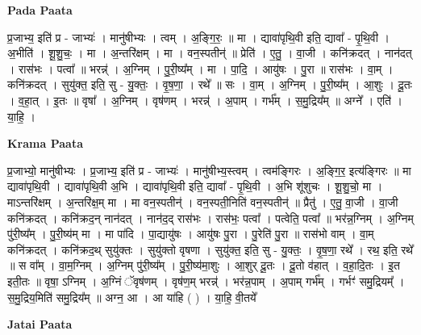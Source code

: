 \documentclass[17pt]{extarticle}
\begin{document}
\textbf{Pada Paata} \newline

प्र॒जाभ्य॒ इति॑ प्र - जाभ्यः॑ । मानु॑षीभ्यः । त्वम् । अ॒ङ्गि॒रः॒ ॥ मा । द्यावा॑पृथि॒वी इति॒ द्यावा᳚ - पृ॒थि॒वी । अ॒भीति॑ । शू॒शु॒चः॒ । मा । अ॒न्तरि॑क्षम् । मा । वन॒स्पतीन्॑ ॥ प्रेति॑ । ए॒तु॒ । वा॒जी । कनि॑क्रदत् । नान॑दत् । रास॑भः । पत्वा᳚ ॥ भरन्न्॑ । अ॒ग्निम् । पु॒री॒ष्य᳚म् । मा । पा॒दि॒ । आयु॑षः । पु॒रा ॥ रास॑भः । वा॒म् । कनि॑क्रदत् । सुयु॑क्त॒ इति॒ सु - यु॒क्तः॒ । वृ॒ष॒णा॒ । रथे᳚ ॥ सः । वा॒म् । अ॒ग्निम् । पु॒री॒ष्य᳚म् । आ॒शुः । दू॒तः । व॒हा॒त् । इ॒तः ॥ वृषा᳚ । अ॒ग्निम् । वृष॑णम् । भरन्न्॑ । अ॒पाम् । गर्भ᳚म् । स॒मु॒द्रिय᳚म् ॥ अग्ने᳚ । एति॑ । या॒हि॒ ।  \newline


\textbf{Krama Paata} \newline

प्र॒जाभ्यो॒ मानु॑षीभ्यः । प्र॒जाभ्य॒ इति॑ प्र - जाभ्यः॑ । मानु॑षीभ्य॒स्त्वम् । त्वम॑ङ्गिरः । अ॒ङ्गि॒र॒ इत्य॑ङ्गिरः ॥ मा द्यावा॑पृथि॒वी । द्यावा॑पृथि॒वी अ॒भि । द्यावा॑पृथि॒वी इति॒ द्यावा᳚ - पृ॒थि॒वी । अ॒भि शू॑शुचः । शू॒शु॒चो॒ मा । माऽन्तरि॑क्षम् । अ॒न्तरि॑क्ष॒म् मा । मा वन॒स्पतीन्॑ । वन॒स्पती॒निति॑ वन॒स्पतीन्॑ ॥ प्रैतु॑ । ए॒तु॒ वा॒जी । वा॒जी कनि॑क्रदत् । कनि॑क्रद॒न् नान॑दत् । नान॑द॒द् रास॑भः । रास॑भः॒ पत्वा᳚ । पत्वेति॒ पत्वा᳚ ॥ भर॑न्न॒ग्निम् । अ॒ग्निम् पु॑री॒ष्य᳚म् । पु॒री॒ष्य॑म् मा । मा पा॑दि । पा॒द्यायु॑षः । आयु॑षः पु॒रा । पु॒रेति॑ पु॒रा ॥ रास॑भो वाम् । वा॒म् कनि॑क्रदत् । कनि॑क्रद॒थ् सुयु॑क्तः । सुयु॑क्तो वृषणा । सुयु॑क्त॒ इति॒ सु - यु॒क्तः॒ । वृ॒ष॒णा॒ रथे᳚ । रथ॒ इति॒ रथे᳚ ॥ स वा᳚म् । वा॒म॒ग्निम् । अ॒ग्निम् पु॑री॒ष्य᳚म् । पु॒री॒ष्य॑मा॒शुः । आ॒शुर् दू॒तः । दू॒तो व॑हात् । व॒हा॒दि॒तः । इ॒त इती॒तः ॥ वृषा॒ ऽग्निम् । अ॒ग्निं ॅवृष॑णम् । वृष॑ण॒म् भरन्न्॑ । भर॑न्न॒पाम् । अ॒पाम् गर्भ᳚म् । गर्भꣳ॑ समु॒द्रियम्᳚ । स॒मु॒द्रिय॒मिति॑ समु॒द्रिय᳚म् ॥ अग्न॒ आ । आ या॑हि ( ) । या॒हि॒ वी॒तये᳚ \newline

\textbf{Jatai Paata} \newline
\end{document}
